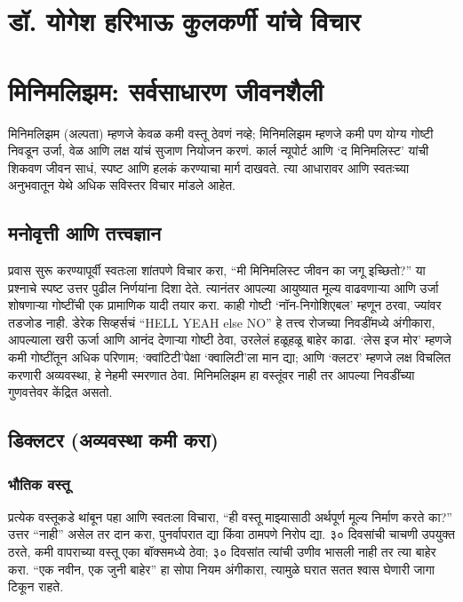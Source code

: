 \chapter*{डॉ. योगेश हरिभाऊ कुलकर्णी  यांचे विचार }

\chapter{मिनिमलिझम: सर्वसाधारण जीवनशैली}

मिनिमलिझम (अल्पता) म्हणजे केवळ कमी वस्तू ठेवणं नव्हे; मिनिमलिझम म्हणजे कमी पण योग्य गोष्टी निवडून उर्जा, वेळ आणि लक्ष यांचं सुजाण नियोजन करणं. कार्ल न्यूपोर्ट आणि ‘द मिनिमलिस्ट’ यांची शिकवण जीवन साधं, स्पष्ट आणि हलकं करण्याचा मार्ग दाखवते. त्या आधारावर आणि स्वतःच्या अनुभवातून येथे अधिक सविस्तर विचार मांडले आहेत.

\section*{मनोवृत्ती आणि तत्त्वज्ञान}

प्रवास सुरू करण्यापूर्वी स्वतःला शांतपणे विचार करा, “मी मिनिमलिस्ट जीवन का जगू इच्छितो?” या प्रश्नाचे स्पष्ट उत्तर पुढील निर्णयांना दिशा देते. त्यानंतर आपल्या आयुष्यात मूल्य वाढवणाऱ्या आणि उर्जा शोषणाऱ्या गोष्टींची एक प्रामाणिक यादी तयार करा. काही गोष्टी ‘नॉन-निगोशिएबल’ म्हणून ठरवा, ज्यांवर तडजोड नाही. डेरेक सिव्हर्सचं “HELL YEAH else NO” हे तत्त्व रोजच्या निवडींमध्ये अंगीकारा, आपल्याला खरी ऊर्जा आणि आनंद देणाऱ्या गोष्टी ठेवा, उरलेलं हळूहळू बाहेर काढा. ‘लेस इज मोर’ म्हणजे कमी गोष्टींतून अधिक परिणाम; ‘क्वांटिटी’पेक्षा ‘क्वालिटी’ला मान द्या; आणि ‘क्लटर’ म्हणजे लक्ष विचलित करणारी अव्यवस्था, हे नेहमी स्मरणात ठेवा. मिनिमलिझम हा वस्तूंवर नाही तर आपल्या निवडींच्या गुणवत्तेवर केंद्रित असतो.

\section*{डिक्लटर (अव्यवस्था कमी करा)}

\subsection*{भौतिक वस्तू}

प्रत्येक वस्तूकडे थांबून पहा आणि स्वतःला विचारा, “ही वस्तू माझ्यासाठी अर्थपूर्ण मूल्य निर्माण करते का?” उत्तर “नाही” असेल तर दान करा, पुनर्वापरात द्या किंवा ठामपणे निरोप द्या. ३० दिवसांची चाचणी उपयुक्त ठरते, कमी वापराच्या वस्तू एका बॉक्समध्ये ठेवा; ३० दिवसांत त्यांची उणीव भासली नाही तर त्या बाहेर करा. “एक नवीन, एक जुनी बाहेर” हा सोपा नियम अंगीकारा, त्यामुळे घरात सतत श्वास घेणारी जागा टिकून राहते.

